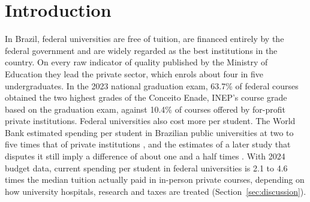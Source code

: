 \documentclass[11pt,a4paper]{article}
\begin{document}
\newpage
\section{Introduction}\label{sec:intro}

In Brazil, federal universities are free of tuition, are financed entirely by the federal government and are widely regarded as the best institutions in the country. On every raw indicator of quality published by the Ministry of Education they lead the private sector, which enrols about four in five undergraduates. In the 2023 national graduation exam, 63.7\% of federal courses obtained the two highest grades of the Conceito Enade, INEP's course grade based on the graduation exam, against 10.4\% of courses offered by for-profit private institutions. Federal universities also cost more per student. The World Bank estimated spending per student in Brazilian public universities at two to five times that of private institutions \citep{worldbank2017}, and the estimates of a later study that disputes it still imply a difference of about one and a half times \citep[Table~11]{bielschowsky2022}. With 2024 budget data, current spending per student in federal universities is 2.1 to 4.6 times the median tuition actually paid in in-person private courses, depending on how university hospitals, research and taxes are treated (Section~\ref{sec:discussion}).
\end{document}
